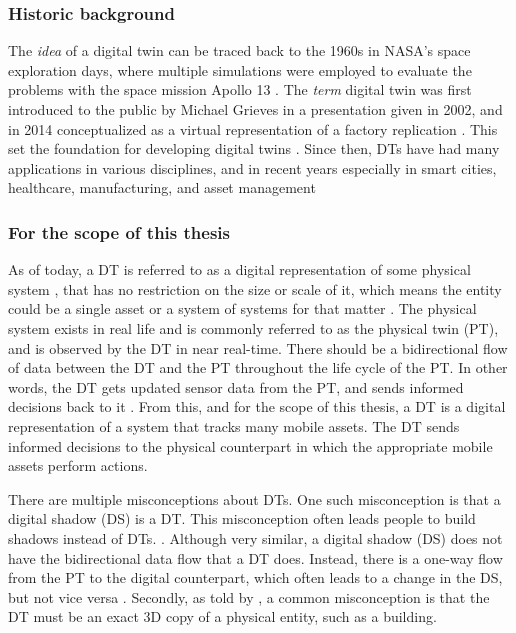 \documentclass{article}
\begin{document}
\subsubsection{Historic background}
The \emph{idea} of a digital twin can be traced back to the 1960s in NASA's space exploration days, where multiple simulations were employed to evaluate the problems with the space mission Apollo 13 \cite{noauthor_digital_nodate, fuller_digital_2020}. The \emph{term} digital twin was first introduced to the public by Michael Grieves in a presentation given in 2002, and in 2014 conceptualized as a virtual representation of a factory replication \cite{grieves_michael_digital_2014}. This set the foundation for developing digital twins \cite{grieves_michael_digital_2014, fuller_digital_2020}. Since then, DTs have had many applications in various disciplines, and in recent years especially in smart cities, healthcare, manufacturing, and asset management \cite{fuller_digital_2020, waszak_let_2022, macchi_exploring_2018}

\subsubsection{For the scope of this thesis}\label{subsubsec:ForTheScope}
As of today, a DT is referred to as a digital representation of some physical system \cite{grieves_digital_2017}, that has no restriction on the size or scale of it, which means the entity could be a single asset or a system of systems for that matter \cite{li_digital_2022, waszak_let_2022}. The physical system exists in real life and is commonly referred to as the physical twin (PT), and is observed by the DT in near real-time. There should be a bidirectional flow of data between the DT and the PT throughout the life cycle of the PT. In other words, the DT gets updated sensor data from the PT, and sends informed decisions back to it \cite{madni_leveraging_2019, waszak_let_2022, kamburjan_digital_2022}. From this, and for the scope of this thesis, a DT is a digital representation of a system that tracks many mobile assets. The DT sends informed decisions to the physical counterpart in which the appropriate mobile assets perform actions.

There are multiple misconceptions about DTs. One such misconception is that a digital shadow (DS) is a DT. This misconception often leads people to build shadows instead of DTs. \cite{fuller_digital_2020, li_digital_2022}.  Although very similar, a digital shadow (DS) does not have the bidirectional data flow that a DT does. Instead, there is a one-way flow from the PT to the digital counterpart, which often leads to a change in the DS, but not vice versa \cite{kritzinger_digital_2018, li_digital_2022}. Secondly, as told by \citeauthor{fuller_digital_2020}, a common misconception is that the DT must be an exact 3D copy of a physical entity, such as a building.
\end{document}
